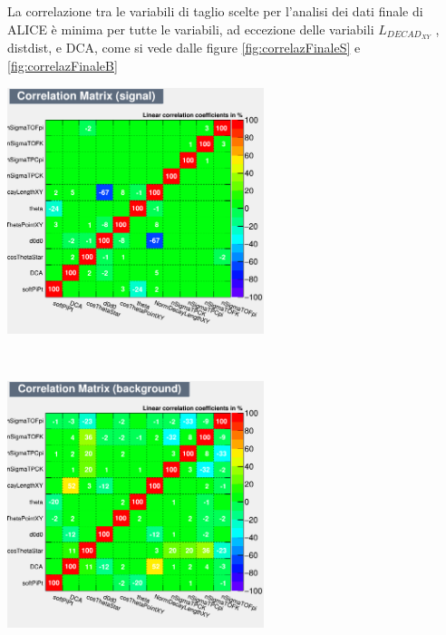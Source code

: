     La correlazione tra le variabili di taglio scelte per l'analisi dei dati finale di ALICE è minima per tutte le variabili, ad eccezione delle variabili $L_{{DECAD}_{XY}}$ , distdist, e DCA, come si vede dalle figure \ref{fig:correlazFinaleS} e \ref{fig:correlazFinaleB}
    \\
   
      \begin{minipage}{.5\textwidth}%
        \begin{flushleft} \large
        \flushleft
        \includegraphics[width=7.5cm]{training&testing/CorrelationMatrixS.png}
        \label{fig:correlazFinaleS}
        \end{flushleft}
        \end{minipage}
    ~
    \begin{minipage}{0.5\textwidth}
        \begin{flushright} \large
        \includegraphics[width=7.5cm]{training&testing/CorrelationMatrixB.png}
        \label{fig:correlazFinaleB}
        \end{flushright}
    \end{minipage} \\[1.cm]
    
